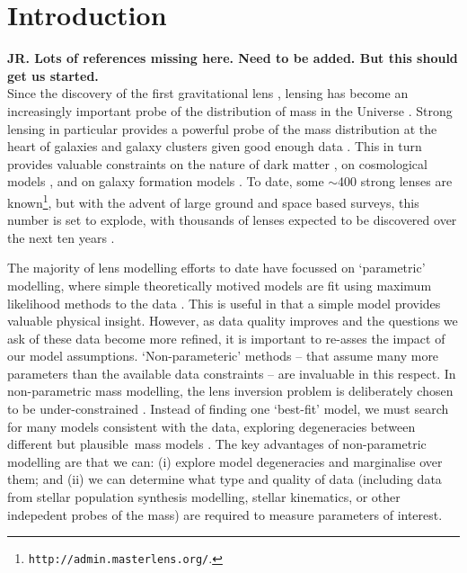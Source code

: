 \documentclass[galley]{mn2e}
\begin{document}
\section{Introduction}\label{sec:intro}
{\bf JR. Lots of references missing here. Need to be added. But this should get us started.}\\

Since the discovery of the first gravitational lens \citep{1979Natur.279..381W}, lensing has become an increasingly important probe of the distribution of mass in the Universe \citep{1937ApJ....86..217Z,2012arXiv1206.1225A}. Strong lensing in particular provides a powerful probe of the mass distribution at the heart of galaxies and galaxy clusters given good enough data \citep{2010CQGra..27w3001B,2007ApJ...667..645R,2006ApJ...652L...5S,2009ApJ...690..154S}. This in turn provides valuable constraints on the nature of dark matter \citep{2006ApJ...652L...5S,2013ApJ...765...25N}, on cosmological models \citep{2010Sci...329..924J, 2008ApJ...679...17C}, and on galaxy formation models \citep{2012MNRAS.424..104L}. To date, some $\sim$400 strong lenses are known\footnote{{\tt http://admin.masterlens.org/}.}, but with the advent of large ground and space based surveys, this number is set to explode, with thousands of lenses expected to be discovered over the next ten years \citep{2012arXiv1206.1225A, 2010AAS...21540115M, 2004NewAR..48.1085K}.

The majority of lens modelling efforts to date have focussed on `parametric' modelling, where simple theoretically motived models are fit using maximum likelihood methods to the data \citep{2011A&ARv..19...47K, 1993A&A...273..367K, 2010GReGr..42.2151K}. This is useful in that a simple model provides valuable physical insight. However, as data quality improves and the questions we ask of these data become more refined, it is important to re-asses the impact of our model assumptions. `Non-parameteric' methods -- that assume many more parameters than the available data constraints -- are invaluable in this respect. In non-parametric mass modelling, the lens inversion problem is deliberately chosen to be under-constrained \citep{1997MNRAS.292..148S,2005MNRAS.360..477D,2010ApJ...723.1678C,2006MNRAS.367.1209L,2013arXiv1304.2393S}. Instead of finding one `best-fit' model, we must search for many models consistent with the data, exploring degeneracies between different but plausible\footnotemark\ mass models \citep{2000AJ....120.1654S,2006ApJ...653..936S,2008MNRAS.386..307L}. The key advantages of non-parametric modelling are that we can: (i) explore model degeneracies and marginalise over them; and (ii) we can determine what type and quality of data (including data from stellar population synthesis modelling, stellar kinematics, or other indepedent probes of the mass) are required to measure parameters of interest.
\end{document}
